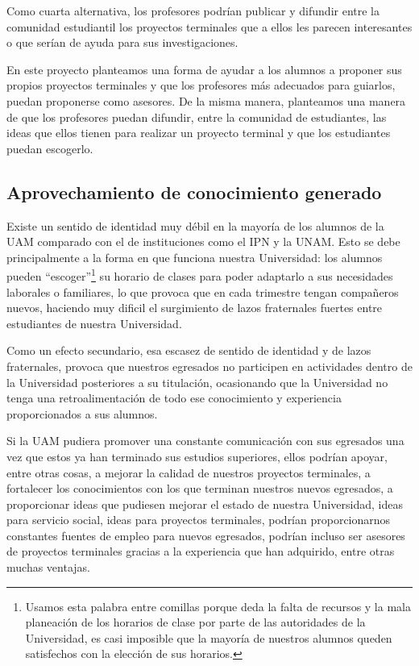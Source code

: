 \documentclass[12pt,letterpaper,titlepage]{article}
\begin{document}
Como cuarta alternativa, los profesores podr\'ian publicar y difundir entre la comunidad estudiantil los proyectos terminales que a ellos les parecen interesantes o que ser\'ian de ayuda para sus investigaciones.

En este proyecto planteamos una forma de ayudar a los alumnos a proponer sus propios proyectos terminales y que los profesores m\'as adecuados para guiarlos, puedan proponerse como asesores. De la misma manera, planteamos una manera de que los profesores puedan difundir, entre la comunidad de estudiantes, las ideas que ellos tienen para realizar un proyecto terminal y que los estudiantes puedan escogerlo.

\subsection{Aprovechamiento de conocimiento generado}
Existe un sentido de identidad muy d\'ebil en la mayor\'ia de los alumnos de la UAM comparado con el de instituciones como el IPN y la UNAM. Esto se debe principalmente a la forma en que funciona nuestra Universidad: los alumnos pueden ``escoger''\footnote{Usamos esta palabra entre comillas porque deda la falta de recursos y la mala planeaci\'on de los horarios de clase por parte de las autoridades de la Universidad, es casi imposible que la mayor\'ia de nuestros alumnos queden satisfechos con la elecci\'on de sus horarios.}  su horario de clases para poder adaptarlo a sus necesidades laborales o familiares, lo que provoca que en cada trimestre tengan compa\~neros nuevos, haciendo muy dificil el surgimiento de lazos fraternales fuertes entre estudiantes de nuestra Universidad.

Como un efecto secundario, esa escasez de sentido de identidad y de lazos fraternales, provoca que nuestros egresados no participen en actividades dentro de la Universidad posteriores a su titulaci\'on, ocasionando que la Universidad no tenga una retroalimentaci\'on de todo ese conocimiento y experiencia proporcionados a sus alumnos.

Si la UAM pudiera promover una constante comunicaci\'on con sus egresados una vez que estos ya han terminado sus estudios superiores, ellos podr\'ian apoyar, entre otras cosas, a mejorar la calidad de nuestros proyectos terminales, a fortalecer los conocimientos con los que terminan nuestros nuevos egresados, a proporcionar ideas que pudiesen mejorar el estado de nuestra Universidad, ideas para servicio social, ideas para proyectos terminales, podr\'ian proporcionarnos constantes fuentes de empleo para nuevos egresados, podr\'ian incluso ser asesores de proyectos terminales gracias a la experiencia que han adquirido, entre otras muchas ventajas.
\end{document}
